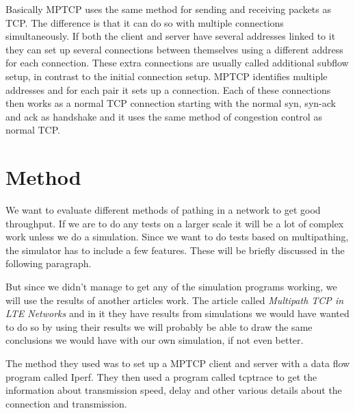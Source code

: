 \documentclass[11pt,twocolumn]{article}
\begin{document}
Basically MPTCP uses the same method for sending and receiving packets as TCP. The difference is that it can do so with multiple connections simultaneously. If both the client and server have several addresses linked to it they can set up several connections between themselves using a different address for each connection. These extra connections are usually called additional subflow setup, in contrast to the initial connection setup. MPTCP identifies multiple addresses and for each pair it sets up a connection. Each of these connections then works as a normal TCP connection starting with the normal syn, syn-ack and ack as handshake and it uses the same method of congestion control as normal TCP. 

\section{Method}

We want to evaluate different methods of pathing in a network to get good throughput. If we are to do any tests on a larger scale it will be a lot of complex work unless we do a simulation. Since we want to do tests based on multipathing, the simulator has to include a few features. These will be briefly discussed in the following paragraph.

But since we didn't manage to get any of the simulation programs working, we will use the results of another articles work. The article called \emph{Multipath TCP in LTE Networks} and in it they have results from simulations we would have wanted to do so by using their results we will probably be able to draw the same conclusions we would have with our own simulation, if not even better.

The method they used was to set up a MPTCP client and server with a data flow program called Iperf. They then used a program called tcptrace to get the information about transmission speed, delay and other various details about the connection and transmission.


\end{document}
